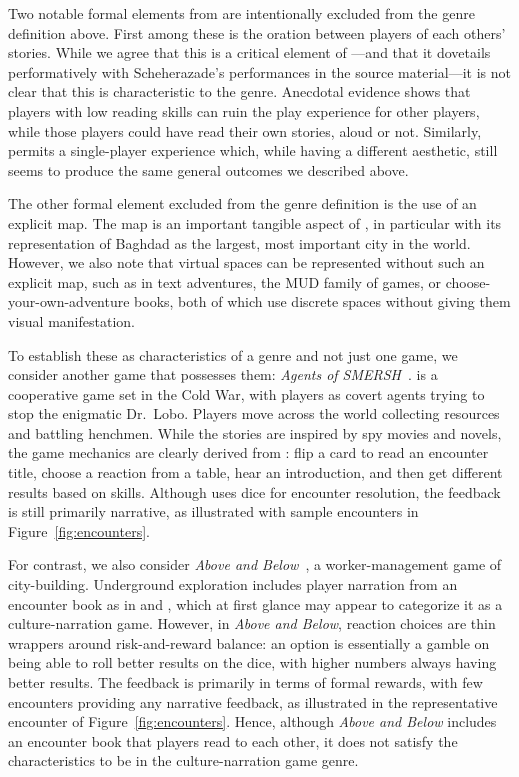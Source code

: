 \documentclass[a4paper]{article}
\begin{document}
Two notable formal elements from \totan{} are intentionally excluded from the
genre definition above. First among these is the oration between players
of each others' stories. While we agree that this is a critical element of 
\totan{}---and that it dovetails performatively 
with Scheherazade's
performances in the source material---it is not clear that this is
characteristic to the genre.  Anecdotal evidence shows that
players with low reading skills can ruin the play experience for other
players, while those players could have read their own stories, aloud or not.
Similarly, \totan{} permits a single-player experience which, while
having a different aesthetic, still seems to produce the same general outcomes
we described above.

The other formal element excluded from the genre definition is the use of an
explicit map. The map is an important tangible aspect of \totan{}, 
in particular with its representation of Baghdad as the largest, most
important city in the world. 
However, we also note that virtual spaces
can be represented without such an explicit map, such as in text adventures,
the MUD family of games, or choose-your-own-adventure books, both of which
use discrete spaces without giving them visual manifestation.

To establish these as characteristics of a genre and not just one game,
we consider another game that possesses them: 
\textit{Agents of SMERSH}~\citep{Maxwell2012}.
\smersh{} is a cooperative game set in the Cold War, with players as 
covert agents trying to stop the enigmatic Dr.\ Lobo. 
Players move across the world collecting resources and battling henchmen.
While the stories are inspired by spy movies and novels,
the game mechanics are clearly derived from \totan{}: flip a card to read an
encounter title, choose a reaction from a table, hear an introduction,
and then get different results based on skills.
Although \smersh{} uses dice for encounter resolution, the feedback is still
primarily narrative, as illustrated with sample encounters in
Figure~\ref{fig:encounters}.

For contrast, we also consider \textit{Above and Below}~\citep{Laukat2015}, a
worker-management game of city-building.  
Underground exploration includes  player narration
from an encounter book as in \totan{} and \smersh{}, which at first
glance may appear to categorize it as a culture-narration game.
However, in \textit{Above and Below}, reaction choices are thin
wrappers around risk-and-reward balance:
an option is essentially a gamble on being able to roll better
results on the dice, with higher numbers always having better results.
The feedback is primarily in terms of formal rewards, with few
encounters providing any narrative feedback, as illustrated in
the representative encounter of Figure~\ref{fig:encounters}.
Hence, although \textit{Above and Below} includes an encounter book
that players read to each other, it does not satisfy the characteristics
to be in the culture-narration game genre.
\end{document}
